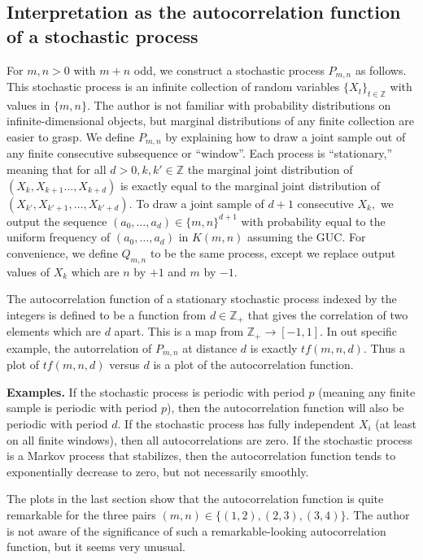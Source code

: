 \documentclass[11pt]{amsart} %
\begin{document}
\subsection{Interpretation as the autocorrelation function of a stochastic process}
For $m, n>0$ with $m+n$ odd, we construct a stochastic process $P_{m, n}$ as follows. This stochastic process is an infinite collection of random variables $\{X_t\}_{t \in \mathbb{Z}}$ with values in $\{m, n\}$. The author is not familiar with probability distributions on infinite-dimensional objects, but marginal distributions of any finite collection are easier to grasp. We define $P_{m, n}$ by explaining how to draw a joint sample out of any finite consecutive subsequence or ``window''. Each process is ``stationary,'' meaning that for all $d>0, k, k' \in \mathbb{Z}$ the marginal joint distribution of $(X_k,X_{k+1}\ldots, X_{k+d})$ is exactly equal to the marginal joint distribution of $(X_{k'}, X_{k' + 1}, \ldots, X_{k' + d}).$ To draw a joint sample of $d+1$ consecutive $X_k,$ we output the sequence $(a_0, \ldots, a_d) \in \{m, n\}^{d+1}$ with probability equal to the uniform frequency of $(a_0, \ldots, a_d)$ in $K(m, n)$ assuming the GUC. For convenience, we define $Q_{m, n}$ to be the same process, except we replace output values of $X_k$ which are $n$ by $+1$ and $m$ by $-1.$

The autocorrelation function of a stationary stochastic process indexed by the integers is defined to be a function from $d \in \mathbb{Z}_+$ that gives the correlation of two elements which are $d$ apart. This is a map from $\mathbb{Z}_+ \rightarrow [-1, 1].$ In out specific example, the autorrelation of $P_{m, n}$ at distance $d$ is exactly $tf(m, n, d).$ Thus a plot of $tf(m, n, d)$ versus $d$ is a plot of the autocorrelation function.

\textbf{Examples.} If the stochastic process is periodic with period $p$ (meaning any finite sample is periodic with period $p$), then the autocorrelation function will also be periodic with period $d.$ If 
the stochastic process has fully independent $X_i$ (at least on all finite windows), then all autocorrelations are zero. If the stochastic process is a Markov process that stabilizes, then the autocorrelation function tends to exponentially decrease to zero, but not necessarily smoothly.

The plots in the last section show that the autocorrelation function is quite remarkable for the three pairs $(m, n) \in \{(1,2), (2,3), (3,4)\}.$ The author is not aware of the significance of such a remarkable-looking autocorrelation function, but it seems very unusual.
\end{document}
